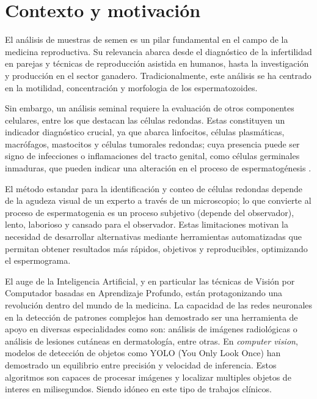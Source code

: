 \documentclass[12pt,a4paper,onecolumn,oneside]{report}
\begin{document}
\section{Contexto y motivación}
\label{sec:Contexto y motivación}

El análisis de muestras de semen es un pilar fundamental en el campo de la medicina reproductiva. Su relevancia abarca desde el diagnóstico 
de la infertilidad en parejas y técnicas de reproducción asistida en humanos, hasta la investigación y producción en el sector ganadero. Tradicionalmente,
este análisis se ha centrado en la motilidad, concentración y morfologia de los espermatozoides.

Sin embargo, un análisis seminal requiere la evaluación de otros componentes celulares, entre los que destacan las células redondas. 
Estas constituyen un indicador diagnóstico crucial, ya que abarca linfocitos, células plasmáticas, macrófagos, mastocitos y células tumorales redondas; cuya presencia puede ser signo de infecciones o inflamaciones 
del tracto genital, como células germinales inmaduras, que pueden indicar una alteración en el proceso de espermatogénesis \cite{HamiltonThorneRoundCells}.

El método estandar para la identificación y conteo de células redondas depende de la agudeza visual de un experto a través de un microscopio; lo que convierte al proceso de
espermatogenia es un proceso subjetivo (depende del observador), lento, laborioso y cansado para el observador. Estas limitaciones motivan la necesidad 
de desarrollar alternativas mediante herramientas automatizadas que permitan obtener resultados más rápidos, objetivos y reproducibles, optimizando el espermograma.

El auge de la Inteligencia Artificial, y en particular las técnicas de Visión por Computador basadas en Aprendizaje Profundo, están protagonizando una revolución dentro del mundo de la medicina.
La capacidad de las redes neuronales en la detección de patrones complejos han demostrado ser una herramienta de apoyo en diversas especialidades como son: análisis de imágenes radiológicas o análisis de lesiones cutáneas en dermatología, entre otras.
En \textit{computer vision}, modelos de detección de objetos como YOLO (You Only Look Once) \cite{ultralytics_models} han demostrado un equilibrio entre precisión y velocidad de inferencia. Estos algoritmos son capaces de procesar imágenes y localizar multiples objetos de interes en milisegundos.
Siendo idóneo en este tipo de trabajos clínicos.
\end{document}
